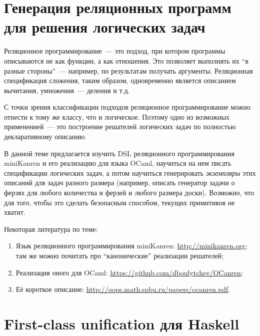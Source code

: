 \documentclass{article}
\begin{document}
\section{Генерация реляционных программ для решения логических задач}

Реляционное программирование~--- это подход, при котором программы описываются не как функции, а как отношения. Это позволяет
выполнять их ``в разные стороны''~--- например, по результатам получать аргументы. Реляционная спецификация сложения,
таким образом, одновременно является описанием вычитания, умножения~--- деления и т.д.

С точки зрения классификации подходов реляционное программирование можно отнести к тому же классу, что и логическое. Поэтому
одно из возможных примененией~--- это построение решателей логических задач по полностью декларативному описанию.

В данной теме предлагается изучить DSL реляционного программирования miniKanren и его реализацию для языка OCaml, научиться
на нем писать спецификации логических задач, а потом научиться генерировать \emph{экземпляры} этих описаний для
задач разного размера (например, описать генератор задачи о ферзях для любого количества и ферзей и 
любого размера доски). Возможно, что для того, чтобы это сделать безопасным способом, текущих примитивов не хватит.

Некоторая литература по теме:

\begin{enumerate}
\item Язык реляционного программирования miniKanren: \url{http://minikanren.org}; там же
можно почитать про ``канонические'' реализации решателей;
\item Реализация оного для OCaml: \url{https://github.com/dboulytchev/OCanren};
\item Её короткое описание: \url{http://oops.math.spbu.ru/papers/ocanren.pdf}.
\end{enumerate}



\section{First-class unification для Haskell}
\end{document}
